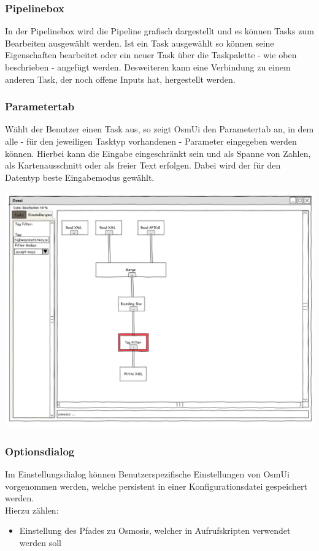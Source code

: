 \documentclass[a4paper,12pt]{scrartcl}
\begin{document}
\subsubsection{Pipelinebox}
In der Pipelinebox wird die Pipeline grafisch dargestellt und es können Tasks zum Bearbeiten ausgewählt werden. Ist ein Task ausgewählt so können seine Eigenschaften
bearbeitet oder ein neuer Task über die Taskpalette - wie oben beschrieben - angefügt werden. Desweiteren kann eine Verbindung zu einem anderen Task, der noch offene
Inputs hat, hergestellt werden.
\subsubsection{Parametertab}
Wählt der Benutzer einen Task aus, so zeigt OsmUi den Parametertab an, in dem alle - für den jeweiligen Tasktyp vorhandenen - Parameter eingegeben werden können.
Hierbei kann die Eingabe eingeschränkt sein und als Spanne von Zahlen, als Kartenausschnitt oder als freier Text erfolgen. Dabei wird der für
den Datentyp beste Eingabemodus gewählt.\\
\begin{center}
\includegraphics[width=15cm]{ui_prototype/OsmUi_Parameter_Optionen.png}
\end{center}
\subsubsection{Optionsdialog}
Im Einstellungsdialog können Benutzerspezifische Einstellungen von OsmUi vorgenommen werden, welche persistent in einer Konfigurationsdatei gespeichert werden.\\
Hierzu zählen:\\
\begin{itemize}
 \item Einstellung des Pfades zu Osmosis, welcher in Aufrufskripten verwendet werden soll
\end{itemize}
\end{document}
